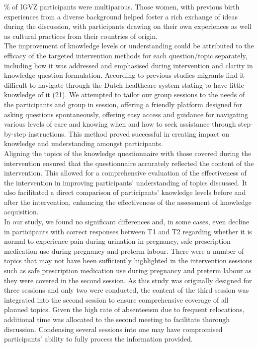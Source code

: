 \documentclass[12pt]{article}
\begin{document}
\% of IGVZ participants were multiparous. Those women, with previous birth experiences from a diverse background helped foster a rich exchange of ideas during the discussion, with participants drawing on their own experiences as well as cultural practices from their countries of origin.\\

\noindent The improvement of knowledge levels or understanding could be attributed to the efficacy of the targeted intervention methods for each question/topic separately, including how it was addressed and emphasised during intervention and clarity in knowledge question formulation. According to previous studies migrants find it difficult to navigate through the Dutch healthcare system stating to have little knowledge of it (21). We attempted to tailor our group sessions to the needs of the participants and group in session, offering a friendly platform designed for asking questions spontaneously, offering easy access and guidance for navigating various levels of care and knowing when and how to seek assistance through step-by-step instructions. This method proved successful in creating impact on knowledge and understanding amongst participants. \\

\noindent Aligning the topics of the knowledge questionnaire with those covered during the intervention ensured that the questionnaire accurately reflected the content of the intervention. This  allowed for a comprehensive evaluation of the effectiveness of the intervention in improving participants' understanding of topics discussed. It also facilitated a direct comparison of participants' knowledge levels before and after the intervention, enhancing the effectiveness of the assessment of knowledge acquisition.\\

\noindent In our study, we found no significant differences and, in some cases, even decline in participants with correct responses between T1 and T2 regarding whether it is normal to experience pain during urination in pregnancy, safe prescription medication use during pregnancy and preterm labour.  There were a number of topics that may not have been sufficiently highlighted in the intervention sessions such as safe prescription medication use during pregnancy and preterm labour as they were covered in the  second session. As this study was originally designed for three sessions and only two were conducted, the content of the third session was integrated into the second session to ensure comprehensive coverage of all planned topics. Given the high rate of absenteeism due to frequent relocations, additional time was allocated to the second meeting to facilitate thorough discussion. Condensing several sessions into one may have compromised participants' ability to fully process the information provided.  \\
\end{document}
